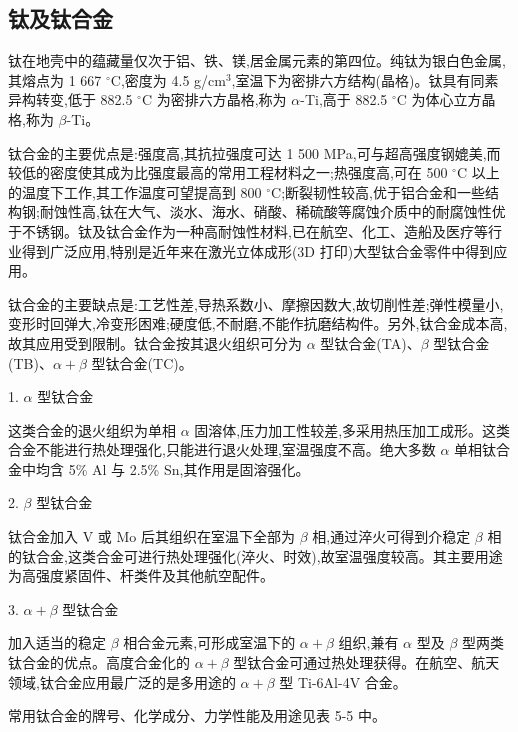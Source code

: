 \documentclass[UTF8]{ctexbook}
\newcommand{\◎}{\ensuremath{\bigcirc}}
\begin{document}
\subsection{钛及钛合金}

钛在地壳中的蕴藏量仅次于铝、铁、镁,居金属元素的第四位。纯钛为银白色金属,其熔点为 1 667 $^\circ$C,密度为 4.5 g/cm$^3$,室温下为密排六方结构(晶格)。钛具有同素异构转变,低于 882.5 $^\circ$C 为密排六方晶格,称为 $\alpha$-Ti,高于 882.5 $^\circ$C 为体心立方晶格,称为 $\beta$-Ti。

钛合金的主要优点是:强度高,其抗拉强度可达 1 500 MPa,可与超高强度钢媲美,而较低的密度使其成为比强度最高的常用工程材料之一;热强度高,可在 500 $^\circ$C 以上的温度下工作,其工作温度可望提高到 800 $^\circ$C;断裂韧性较高,优于铝合金和一些结构钢;耐蚀性高,钛在大气、淡水、海水、硝酸、稀硫酸等腐蚀介质中的耐腐蚀性优于不锈钢。钛及钛合金作为一种高耐蚀性材料,已在航空、化工、造船及医疗等行业得到广泛应用,特别是近年来在激光立体成形(3D 打印)大型钛合金零件中得到应用。

钛合金的主要缺点是:工艺性差,导热系数小、摩擦因数大,故切削性差;弹性模量小,变形时回弹大,冷变形困难;硬度低,不耐磨,不能作抗磨结构件。另外,钛合金成本高,故其应用受到限制。钛合金按其退火组织可分为 $\alpha$ 型钛合金(TA)、$\beta$ 型钛合金(TB)、$\alpha+\beta$ 型钛合金(TC)。

1. $\alpha$ 型钛合金

这类合金的退火组织为单相 $\alpha$ 固溶体,压力加工性较差,多采用热压加工成形。这类合金不能进行热处理强化,只能进行退火处理,室温强度不高。绝大多数 $\alpha$ 单相钛合金中均含 5\% Al 与 2.5\% Sn,其作用是固溶强化。

2. $\beta$ 型钛合金

钛合金加入 V 或 Mo 后其组织在室温下全部为 $\beta$ 相,通过淬火可得到介稳定 $\beta$ 相的钛合金,这类合金可进行热处理强化(淬火、时效),故室温强度较高。其主要用途为高强度紧固件、杆类件及其他航空配件。

3. $\alpha+\beta$ 型钛合金

加入适当的稳定 $\beta$ 相合金元素,可形成室温下的 $\alpha+\beta$ 组织,兼有 $\alpha$ 型及 $\beta$ 型两类钛合金的优点。高度合金化的 $\alpha+\beta$ 型钛合金可通过热处理获得。在航空、航天领域,钛合金应用最广泛的是多用途的 $\alpha+\beta$ 型 Ti-6Al-4V 合金。

常用钛合金的牌号、化学成分、力学性能及用途见表 5-5 中。
\end{document}
